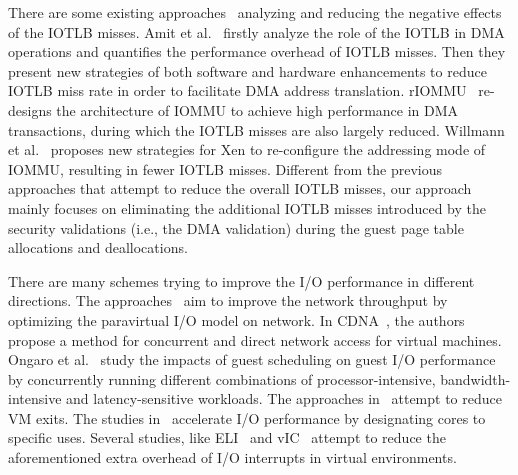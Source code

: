There are some existing approaches~\cite{amit2012iommu, malka2015riommu, willmann2008protection} analyzing and reducing the negative effects of the IOTLB misses.
Amit et al.~\cite{amit2012iommu} firstly analyze the role of the IOTLB in DMA operations and quantifies the performance overhead of IOTLB misses. Then they present new strategies of both software and hardware enhancements to reduce IOTLB miss rate in order to facilitate DMA address translation. rIOMMU~\cite{malka2015riommu} re-designs the architecture of IOMMU to achieve high performance in DMA transactions, during which the IOTLB misses are also largely reduced. Willmann et al.~\cite{willmann2008protection} proposes new strategies for Xen to re-configure the addressing mode of IOMMU, resulting in fewer IOTLB misses.
Different from the previous approaches that attempt to reduce the overall IOTLB misses, our approach mainly focuses on eliminating the additional IOTLB misses introduced by the security validations (i.e., the DMA validation) during the guest page table allocations and deallocations.

There are many schemes trying to improve the I/O performance in different directions.
The approaches~\cite{menon2006optimizing,4734994,santos2008bridging} aim to improve the network throughput by optimizing the paravirtual I/O model on network.
In CDNA~\cite{cdna}, the authors propose a method for concurrent and direct network access for virtual machines.
Ongaro et al.~\cite{ongaro2008scheduling} study the impacts of guest scheduling on guest I/O performance by concurrently running different combinations of processor-intensive, bandwidth-intensive and latency-sensitive workloads. The approaches in~\cite{gordon2012towards,har2013efficient} attempt to reduce VM exits. The studies in~\cite{liao2008software,liu2009virtualization,shalev2010isostack,landau2011splitx,xu2013vturbo} accelerate I/O performance by  designating cores to specific uses.
Several studies, like ELI~\cite{eli} and vIC~\cite{vic} attempt to reduce the aforementioned extra overhead of I/O interrupts in virtual environments.




